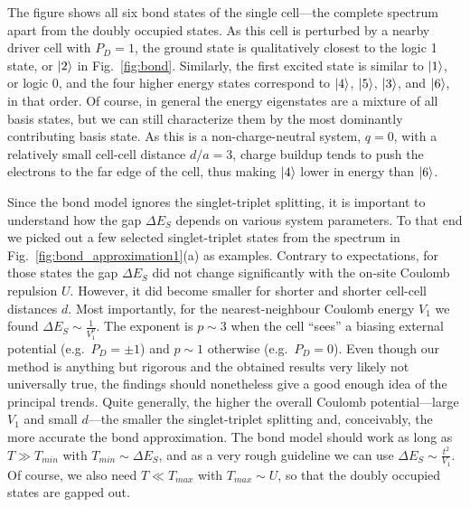 The figure shows all six bond states of the single cell---the complete spectrum
apart from the doubly occupied states. As this cell is perturbed by a nearby
driver cell with $P_D = 1$, the ground state is qualitatively closest to the
logic 1 state, or $\left|2\right>$ in Fig.~\ref{fig:bond}. Similarly, the first excited
state is similar to $\left|1\right>$, or logic 0, and the four higher energy states
correspond to $\left|4\right>$, $\left|5\right>$, $\left|3\right>$, and $\left|6\right>$, in that order. Of
course, in general the energy eigenstates are a mixture of all basis states, but
we can still characterize them by the most dominantly contributing basis state.
As this is a non-charge-neutral system, $q=0$, with a relatively small cell-cell
distance $d/a = 3$, charge buildup tends to push the electrons to the far edge
of the cell, thus making $\left|4\right>$ lower in energy than $\left|6\right>$.

Since the bond model ignores the singlet-triplet splitting, it is important to
understand how the gap $\Delta E_S$ depends on various system parameters. To
that end we picked out a few selected singlet-triplet states from the spectrum
in Fig.~\ref{fig:bond_approximation1}(a) as examples. Contrary to expectations,
for those states the gap $\Delta E_S$ did not change significantly with the
on-site Coulomb repulsion $U$. However, it did become smaller for shorter and
shorter cell-cell distances $d$. Most importantly, for the nearest-neighbour
Coulomb energy $V_1$ we found $\Delta E_S \sim \frac{1}{V_1^p}$. The exponent is
$p \sim 3$ when the cell ``sees'' a biasing external potential (e.g.\ $P_D = \pm
1$) and $p \sim 1$ otherwise (e.g.\ $P_D = 0$). Even though our method is
anything but rigorous and the obtained results very likely not universally true,
the findings should nonetheless give a good enough idea of the principal trends.
Quite generally, the higher the overall Coulomb potential---large $V_1$ and small
$d$---the smaller the singlet-triplet splitting and, conceivably, the more
accurate the bond approximation. The bond model should work as long as $T
\gg T_{min}$ with $T_{min} \sim \Delta E_S$, and as a very rough guideline we can
use $\Delta E_S \sim \frac{t^2}{V_1}$. Of course, we also need $T \ll T_{max}$
with $T_{max} \sim U$, so that the doubly occupied states are gapped out.

